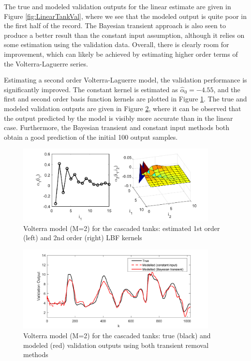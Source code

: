 The true and modeled validation outputs for the linear estimate are given in Figure \ref{fig:LinearTankVal}, where we see that the modeled output is quite poor in the first half of the record. The Bayesian transient approach is also seen to produce a better result than the constant input assumption, although it relies on some estimation using the validation data. Overall, there is clearly room for improvement, which can likely be achieved by estimating higher order terms of the Volterra-Laguerre series.

Estimating a second order Volterra-Laguerre model, the validation performance is significantly improved. The constant kernel is estimated as $\hat{\alpha}_0 = -4.55$, and the first and second order basis function kernels are plotted in Figure \ref{fig:2ndOrderTankEst}. The true and modeled validation outputs are given in Figure \ref{fig:2ndOrderTankVal}, where it can be observed that the output predicted by the model is visibly more accurate than in the linear case. Furthermore, the Bayesian transient and constant input methods both obtain a good prediction of the initial 100 output samples. 

\begin{figure}[h]
\centering
\includegraphics[width=0.9\textwidth]{Chapter6_CaseStudies/Kernels2ndOrder_CT_Coloured.pdf}
\caption{Volterra model (M=2) for the cascaded tanks: estimated 1st order (left) and 2nd order (right) LBF kernels}
\label{fig:2ndOrderTankEst}
\end{figure}

\begin{figure}[h]
\centering
\includegraphics[width=0.9\textwidth]{Chapter6_CaseStudies/2ndOrderValidation.pdf}
\caption{Volterra model (M=2) for the cascaded tanks: true (black) and modeled (red) validation outputs using both transient removal methods}
\label{fig:2ndOrderTankVal}
\end{figure}

